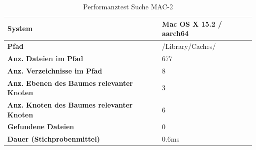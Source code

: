 \documentclass[a4paper,12pt]{report}
\begin{document}
    \begin{table}[h!]
        \centering
        \setlength{\leftmargini}{0.8cm}
        \begin{tabular}{|p{7cm}|p{5cm}|}
            \hline
            \textbf{System}                                            & Mac OS X 15.2 / aarch64 \\ \hline
            \textbf{Pfad}                                              & /Library/Caches/        \\ \hline
            \textbf{Anz. Dateien im Pfad}                              & 677                     \\ \hline
            \textbf{Anz. Verzeichnisse im Pfad}                        & 8                       \\ \hline
            \textbf{Anz. Ebenen \newline des Baumes relevanter Knoten} & 3                       \\ \hline
            \textbf{Anz. Knoten \newline des Baumes relevanter Knoten} & 6                       \\ \hline
            \textbf{Gefundene Dateien}                                 & 0                       \\ \hline
            \textbf{Dauer (Stichprobenmittel)}                        & 0.6ms                   \\ \hline
        \end{tabular}
        \caption{Performanztest Suche MAC-2}\label{tab:perf-search-mac-2}
    \end{table}
\end{document}
